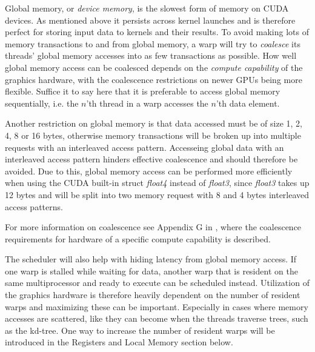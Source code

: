 

Global memory, or \textit{device memory}, is the slowest form of memory on CUDA
devices. As mentioned above it persists across kernel launches and is therefore
perfect for storing input data to kernels and their results. To avoid making
lots of memory transactions to and from global memory, a warp will try to
\textit{coalesce} its threads' global memory accesses into as few transactions
as possible. How well global memory access can be coalesced depends on the
\textit{compute capability} of the graphics hardware, with the coalescence
restrictions on newer GPUs being more flexible. Suffice it to say here that it
is preferable to access global memory sequentially, i.e. the $n$'th thread in a
warp accesses the $n$'th data element.


Another restriction on global memory is that data accessed must be of size 1, 2,
4, 8 or 16 bytes, otherwise memory transactions will be broken up into multiple
requests with an interleaved access pattern. Accesseing global data with an
interleaved access pattern hinders effective coalescence and should therefore
be avoided. Due to this, global memory access can be performed more efficiently
when using the CUDA built-in struct \textit{float4} instead of \textit{float3},
since \textit{float3} takes up 12 bytes and will be split into two memory
request with 8 and 4 bytes interleaved access patterns.

For more information on coalescence see Appendix G in , where
the coalescence requirements for hardware of a specific compute capability is
described.


The scheduler will also help with hiding latency from global memory access. If
one warp is stalled while waiting for data, another warp that is resident on the
same multiprocessor and ready to execute can be scheduled instead. Utilization
of the graphics hardware is therefore heavily dependent on the number of
resident warps and maximizing these can be important. Especially in cases where
memory accesses are scattered, like they can become when the threads traverse
trees, such as the kd-tree. One way to increase the number of resident warps
will be introduced in the Registers and Local Memory section below.

